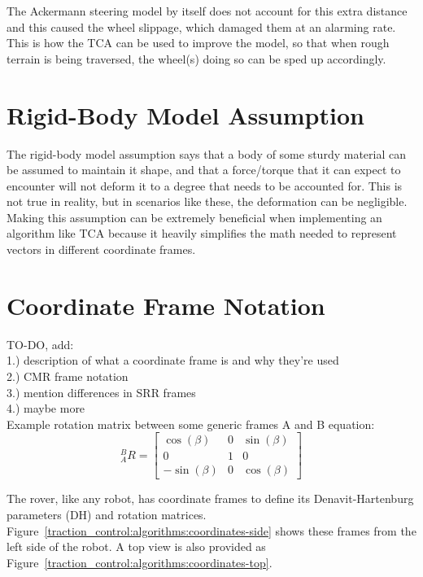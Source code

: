 The Ackermann steering model by itself does not account for this extra distance and this caused the wheel slippage, which damaged them at an alarming rate. This is how the \ac{TCA} can be used to improve the model, so that when rough terrain is being traversed, the wheel(s) doing so can be sped up accordingly.

\section{Rigid-Body Model Assumption}\label{traction_control:algorithms:rigid-body}
The rigid-body model assumption says that a body of some sturdy material can be assumed to maintain it shape, and that a force/torque that it can expect to encounter will not deform it to a degree that needs to be accounted for. This is not true in reality, but in scenarios like these, the deformation can be negligible. \\

Making this assumption can be extremely beneficial when implementing an algorithm like \ac{TCA} because it heavily simplifies the math needed to represent vectors in different coordinate frames.

\section{Coordinate Frame Notation}\label{traction_control:algorithms:coord-frame-notation}

TO-DO, add: \\
 1.) description of what a coordinate frame is and why they're used \\
 2.) \ac{CMR} frame notation \\
 3.) mention differences in \ac{SRR} frames \\
 4.) maybe more \\

Example rotation matrix between some generic frames A and B equation:
\begin{equation}
	{}^{B}_{A}R = \left[\begin{array}{ccc}
		 \cos(\beta) & 0 & \sin(\beta) \\
		 0           & 1 & 0           \\
		-\sin(\beta) & 0 & \cos(\beta)
	\end{array}\right]
\end{equation}

The rover, like any robot, has coordinate frames to define its Denavit-Hartenburg parameters (DH) and rotation matrices. Figure~\ref{traction_control:algorithms:coordinates-side} shows these frames from the left side of the robot. A top view is also provided as Figure~\ref{traction_control:algorithms:coordinates-top}.

